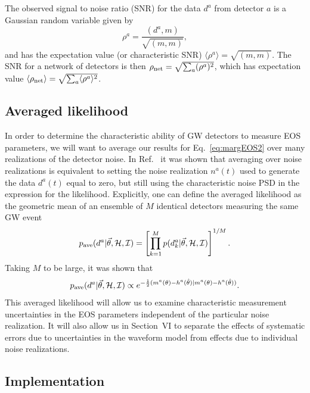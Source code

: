 \documentclass[twocolumn,prd,amssymb,aps,nofootinbib,showpacs,epsf]{revtex4}
\begin{document}
The observed signal to noise ratio (SNR) for the data $d^a$ from detector $a$ is a Gaussian random variable given by
\begin{equation}
\rho^a = \frac{(d^a, m)}{\sqrt{(m, m)}},
\end{equation}
and has the expectation value (or characteristic SNR) $\langle \rho^a \rangle = \sqrt{(m, m)}$. The SNR for a network of detectors is then $\rho_{\rm net} = \sqrt{\sum_a(\rho^a)^2}$, which has expectation value $\langle \rho_{\rm net} \rangle = \sqrt{\sum_a\langle \rho^a \rangle^2}$.

\subsection{Averaged likelihood}
\label{sec:averagelike}

In order to determine the characteristic ability of GW detectors to measure EOS parameters, we will want to average our results for Eq.~\eqref{eq:margEOS2} over many realizations of the detector noise. In Ref.~\cite{NissankeHolzHughes2010} it was shown that averaging over noise realizations is equivalent to setting the noise realization $n^a(t)$ used to generate the data $d^a(t)$ equal to zero, but still using the characteristic noise PSD in the expression for the likelihood. Explicitly, one can define the averaged likelihood as the geometric mean of an ensemble of $M$ identical detectors measuring the same GW event
\begin{equation}
p_{\rm ave}(d^a | \vec\theta, \mathcal{H}, \mathcal{I}) = \left[\prod_{k=1}^M p(d_k^a | \vec\theta, \mathcal{H}, \mathcal{I})\right]^{1/M}.
\end{equation}
Taking $M$ to be large, it was shown that
\begin{equation}
\label{eq:averagedlike}
p_{\rm ave}(d^a | \vec\theta, \mathcal{H}, \mathcal{I}) \propto e^{-\frac{1}{2}(m^a(\theta) - h^a(\hat\theta) | m^a(\theta) - h^a(\hat\theta))}.
\end{equation}
This averaged likelihood will allow us to examine characteristic measurement uncertainties in the EOS parameters independent of the particular noise realization. It will also allow us in Section~VI to separate the effects of systematic errors due to uncertainties in the waveform model from effects due to individual noise realizations.

\subsection{Implementation}
\end{document}
